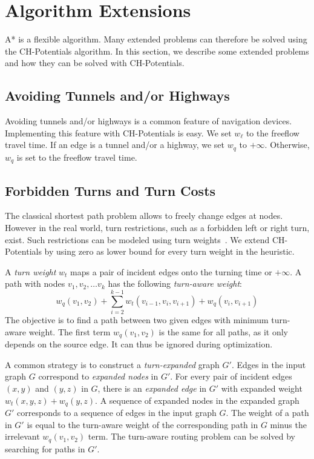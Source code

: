 \documentclass[letterpaper]{article} %
\begin{document}
\section{Algorithm Extensions}
\label{sec:extensions}

A* is a flexible algorithm.
Many extended problems can therefore be solved using the CH-Potentials algorithm.
In this section, we describe some extended problems and how they can be solved with CH-Potentials.

\subsection{Avoiding Tunnels and/or Highways}
\label{sec:no-tunnel-highway}

Avoiding tunnels and/or highways is a common feature of navigation devices.
Implementing this feature with CH-Potentials is easy.
We set $w_\ell$ to the freeflow travel time.
If an edge is a tunnel and/or a highway, we set $w_q$ to $+\infty$.
Otherwise, $w_q$ is set to the freeflow travel time.

\subsection{Forbidden Turns and Turn Costs}
\label{sec:no-turns}

The classical shortest path problem allows to freely change edges at nodes.
However in the real world, turn restrictions, such as a forbidden left or right turn, exist.
Such restrictions can be modeled using turn weights~\cite{gv-errnt-11,dgpw-crprn-13,bwzz-cchtc-20}.
We extend CH-Potentials by using zero as lower bound for every turn weight in the heuristic.

A \emph{turn weight} $w_t$  maps a pair of incident edges onto the turning time or $+\infty$.
A path with nodes $v_1, v_2,\ldots v_k$ has the following \emph{turn-aware weight}:\[
w_q(v_1, v_2) + \sum_{i=2}^{k-1}  w_t(v_{i-1},v_i,v_{i+1})  + w_q(v_i,v_{i+1})
\] The objective is to find a path between two given edges with minimum turn-aware weight.
The first term $w_q(v_1, v_2)$ is the same for all paths, as it only depends on the source edge.
It can thus be ignored during optimization.

A common strategy is to construct a \emph{turn-expanded} graph $G'$.
Edges in the input graph $G$ correspond to \emph{expanded nodes} in $G'$.
For every pair of incident edges $(x,y)$ and $(y,z)$ in $G$, there is an \emph{expanded edge} in $G'$ with expanded weight $w_t(x,y,z) + w_q(y,z)$.
A sequence of expanded nodes in the expanded graph $G'$ corresponds to a sequence of edges in the input graph $G$.
The weight of a path in $G'$ is equal to the turn-aware weight of the corresponding path in $G$ minus the irrelevant $w_q(v_1,v_2)$ term.
The turn-aware routing problem can be solved by searching for paths in $G'$.
\end{document}
